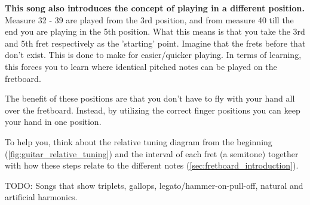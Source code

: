 \textbf{This song also introduces the concept of playing in a different position.} Measure 32 - 39 are played from the 3rd position, and from measure 40 till the end you are playing in the 5th position. What this means is that you take the 3rd and 5th fret respectively as the 'starting' point. Imagine that the frets before that don't exist. This is done to make for easier/quicker playing. In terms of learning, this forces you to learn where identical pitched notes can be played on the fretboard.

The benefit of these positions are that you don't have to fly with your hand all over the fretboard. Instead, by utilizing the correct finger positions you can keep your hand in one position.

To help you, think about the relative tuning diagram from the beginning (\autoref{fig:guitar_relative_tuning}) and the interval of each fret (a semitone) together with how these steps relate to the different notes (\autoref{sec:fretboard_introduction}). 



TODO: Songs that show triplets, gallops, legato/hammer-on-pull-off, natural and artificial harmonics.



